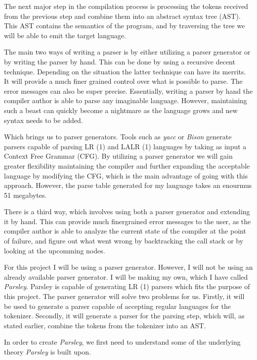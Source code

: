 The next major step in the compilation process is processing the tokens received from the previous step and combine them into an abstract syntax tree (AST). This AST contains the semantics of the program, and by traversing the tree we will be able to emit the target language. 

The main two ways of writing a parser is by either utilizing a parser generator or by writing the parser by hand. This can be done by using a recursive decent technique. Depending on the situation the latter technique can have its merrits. It will provide a much finer grained control over what is possible to parse. The error messages can also be super precise. Essentially, writing a parser by hand the compiler author is able to parse any imaginable language. However, maintaining such a beast can quickly become a nightmare as the language grows and new syntax needs to be added. 

Which brings us to parser generators. Tools such as \textit{yacc} or \textit{Bison} generate parsers capable of parsing LR (1) and LALR (1) languages by taking as input a Context Free Grammar (CFG). By utilizing a parser generator we will gain greater flexibility maintaining the compiler and further expanding the acceptable language by modifying the CFG, which is the main advantage of going with this approach. However, the parse table generated for my language takes an enourmus 51 megabytes. 

There is a third way, which involves using both a parser generator and extending it by hand. This can provide much finergrained error messages to the user, as the compiler author is able to analyze the current state of the compiler at the point of failure, and figure out what went wrong by backtracking the call stack or by looking at the upcomming nodes.

For this project I will be using a parser generator. However, I will not be using an already available parser generator. I will be making my own, which I have called \textit{Parsley}. Parsley is capable of generating LR (1) parsers which fits the purpose of this project. The parser generator will solve two problems for us. Firstly, it will be used to generate a parser capable of accepting regular languages for the tokenizer. Secondly, it will generate a parser for the parsing step, which will, as stated earlier, combine the tokens from the tokenizer into an AST.

In order to create \textit{Parsley}, we first need to understand some of the underlying theory \textit{Parsley} is built upon. 

